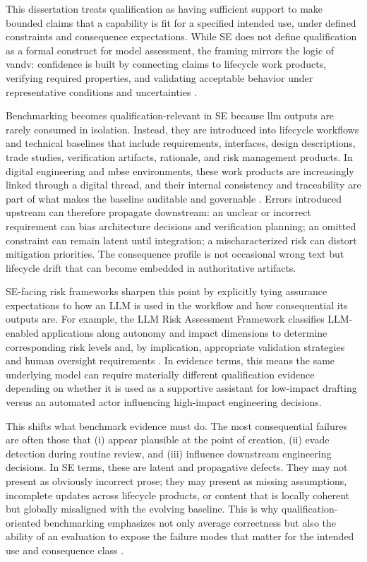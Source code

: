 This dissertation treats qualification as having sufficient support to make bounded claims that a capability is fit for a specified intended use, under defined constraints and consequence expectations. While SE does not define qualification as a formal construct for model assessment, the framing mirrors the logic of \ac{vandv}: confidence is built by connecting claims to lifecycle work products, verifying required properties, and validating acceptable behavior under representative conditions and uncertainties \cite{standard_ieee_15288_2023, walden_systems_engineering_handbook_2015}.

Benchmarking becomes qualification-relevant in SE because \ac{llm} outputs are rarely consumed in isolation. Instead, they are introduced into lifecycle workflows and technical baselines that include requirements, interfaces, design descriptions, trade studies, verification artifacts, rationale, and risk management products. In digital engineering and \ac{mbse} environments, these work products are increasingly linked through a digital thread, and their internal consistency and traceability are part of what makes the baseline auditable and governable \cite{deputyassistantsecretaryofdefense_DepartmentDefenseDigitalStrategy_2018, estefanSurveyModelBasedSystems2008}. Errors introduced upstream can therefore propagate downstream: an unclear or incorrect requirement can bias architecture decisions and verification planning; an omitted constraint can remain latent until integration; a mischaracterized risk can distort mitigation priorities. The consequence profile is not occasional wrong text but lifecycle drift that can become embedded in authoritative artifacts.

SE-facing risk frameworks sharpen this point by explicitly tying assurance expectations to how an LLM is used in the workflow and how consequential its outputs are. For example, the LLM Risk Assessment Framework classifies LLM-enabled applications along autonomy and impact dimensions to determine corresponding risk levels and, by implication, appropriate validation strategies and human oversight requirements \cite{otten_GenerativeAISystemsRiskAssessment_2026}. In evidence terms, this means the same underlying model can require materially different qualification evidence depending on whether it is used as a supportive assistant for low-impact drafting versus an automated actor influencing high-impact engineering decisions.

This shifts what benchmark evidence must do. The most consequential failures are often those that (i) appear plausible at the point of creation, (ii) evade detection during routine review, and (iii) influence downstream engineering decisions. In SE terms, these are latent and propagative defects. They may not present as obviously incorrect prose; they may present as missing assumptions, incomplete updates across lifecycle products, or content that is locally coherent but globally misaligned with the evolving baseline. This is why qualification-oriented benchmarking emphasizes not only average correctness but also the ability of an evaluation to expose the failure modes that matter for the intended use and consequence class \cite{amodei_ConcreteProblemsAISafety_2016}.

